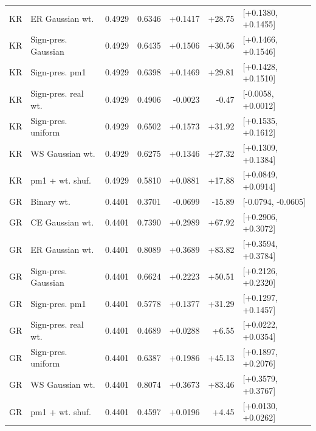 \begin{tabular}{llrrrrl}
KR & ER Gaussian wt. & 0.4929 & 0.6346 & +0.1417 & +28.75 & [+0.1380, +0.1455] \\
KR & Sign-pres. Gaussian & 0.4929 & 0.6435 & +0.1506 & +30.56 & [+0.1466, +0.1546] \\
KR & Sign-pres. pm1 & 0.4929 & 0.6398 & +0.1469 & +29.81 & [+0.1428, +0.1510] \\
KR & Sign-pres. real wt. & 0.4929 & 0.4906 & -0.0023 & -0.47 & [-0.0058, +0.0012] \\
KR & Sign-pres. uniform & 0.4929 & 0.6502 & +0.1573 & +31.92 & [+0.1535, +0.1612] \\
KR & WS Gaussian wt. & 0.4929 & 0.6275 & +0.1346 & +27.32 & [+0.1309, +0.1384] \\
KR & pm1 + wt. shuf. & 0.4929 & 0.5810 & +0.0881 & +17.88 & [+0.0849, +0.0914] \\
GR & Binary wt. & 0.4401 & 0.3701 & -0.0699 & -15.89 & [-0.0794, -0.0605] \\
GR & CE Gaussian wt. & 0.4401 & 0.7390 & +0.2989 & +67.92 & [+0.2906, +0.3072] \\
GR & ER Gaussian wt. & 0.4401 & 0.8089 & +0.3689 & +83.82 & [+0.3594, +0.3784] \\
GR & Sign-pres. Gaussian & 0.4401 & 0.6624 & +0.2223 & +50.51 & [+0.2126, +0.2320] \\
GR & Sign-pres. pm1 & 0.4401 & 0.5778 & +0.1377 & +31.29 & [+0.1297, +0.1457] \\
GR & Sign-pres. real wt. & 0.4401 & 0.4689 & +0.0288 & +6.55 & [+0.0222, +0.0354] \\
GR & Sign-pres. uniform & 0.4401 & 0.6387 & +0.1986 & +45.13 & [+0.1897, +0.2076] \\
GR & WS Gaussian wt. & 0.4401 & 0.8074 & +0.3673 & +83.46 & [+0.3579, +0.3767] \\
GR & pm1 + wt. shuf. & 0.4401 & 0.4597 & +0.0196 & +4.45 & [+0.0130, +0.0262] \\
\bottomrule
\end{tabular}
